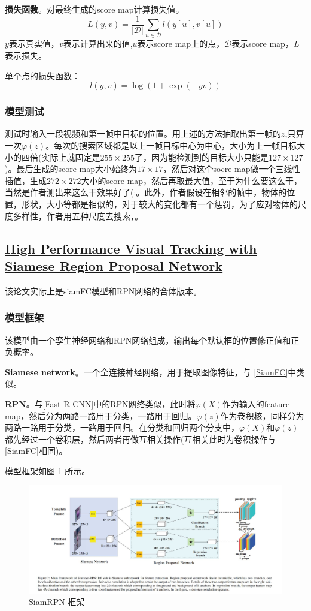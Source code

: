 \documentclass[]{article}
\begin{document}
\textbf{损失函数}。对最终生成的score map计算损失值。
\begin{equation}
	L(y,v)=\frac{1}{|\mathcal{D}|}\sum_{u\in \mathcal{D}}l(y[u],v[u])
\end{equation}
$y$表示真实值，$v$表示计算出来的值,$u$表示score map上的点，$\mathcal{D}$表示score map，$L$表示损失。

单个点的损失函数：
\begin{equation}
	l(y,v)=\log (1+\exp(-yv))
\end{equation}

\subsubsection{模型测试}
测试时输入一段视频和第一帧中目标的位置。用上述的方法抽取出第一帧的$z$,只算一次$\varphi (z)$。每次的搜索区域都是以上一帧目标中心为中心，大小为上一帧目标大小的四倍(实际上就固定是$255 \times 255$了，因为能检测到的目标大小只能是$127\times 127$)。最后生成的score map大小始终为$17 \times 17$，然后对这个socre map做一个三线性插值，生成$272 \times 272$大小的score map，然后再取最大值，至于为什么要这么干，当然是作者测出来这么干效果好了(:。此外，作者假设在相邻的帧中，物体的位置，形状，大小等都是相似的，对于较大的变化都有一个惩罚，为了应对物体的尺度多样性，作者用五种尺度去搜索，。

\subsection{\href{./papers/High Performance Visual Tracking with Siamese Region Proposal Network.pdf}{High Performance Visual Tracking with Siamese Region Proposal Network}}
该论文实际上是siamFC模型和RPN网络的合体版本。
\subsubsection{模型框架}
该模型由一个孪生神经网络和RPN网络组成，输出每个默认框的位置修正值和正负概率。


\textbf{Siamese network}。一个全连接神经网络，用于提取图像特征，与 \ref{SiamFC}中类似。

\textbf{RPN}。与\ref{Fast R-CNN}中的RPN网络类似，此时将$\varphi(X)$作为输入的feature map，然后分为两路一路用于分类，一路用于回归。$\varphi(z)$作为卷积核，同样分为两路一路用于分类，一路用于回归。在分类和回归两个分支中，$\varphi(X)$和$\varphi(z)$都先经过一个卷积层，然后两者再做互相关操作(互相关此时为卷积操作与\ref{SiamFC}相同)。

模型框架如图 \ref{SiamRPN_architecture} 所示。
\begin{figure}
	\centering
	\includegraphics[width=0.9\linewidth]{./images/siamRPN.jpg} 
	\caption{SiamRPN 框架}
	\label{SiamRPN_architecture} 
\end{figure}
\end{document}
